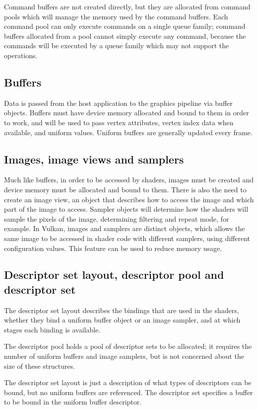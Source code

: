 Command buffers are not created directly, but they are allocated from command pools which will manage the memory used by the command buffers. Each command pool can only execute commands on a single queue family; command buffers allocated from a pool cannot simply execute any command, because the commands will be executed by a queue family which may not support the operations.

\subsection{Buffers}
Data is passed from the host application to the graphics pipeline via buffer objects. Buffers must have device memory allocated and bound to them in order to work, and will be used to pass vertex attributes, vertex index data when available, and uniform values. Uniform buffers are generally updated every frame.

\subsection{Images, image views and samplers}
Much like buffers, in order to be accessed by shaders, images must be created and device memory must be allocated and bound to them. There is also the need to create an image view, an object that describes how to access the image and which part of the image to access. Sampler objects will determine how the shaders will sample the pixels of the image, determining filtering and repeat mode, for example. In Vulkan, images and samplers are distinct objects, which allows the same image to be accessed in shader code with different samplers, using different configuration values. This feature can be used to reduce memory usage.

\subsection{Descriptor set layout, descriptor pool and descriptor set}
The descriptor set layout describes the bindings that are used in the shaders, whether they bind a uniform buffer object or an image sampler, and at which stages each binding is available.

The descriptor pool holds a pool of descriptor sets to be allocated; it requires the number of uniform buffers and image samplers, but is not concerned about the size of these structures.

The descriptor set layout is just a description of what types of descriptors can be bound, but no uniform buffers are referenced. The descriptor set specifies a buffer to be bound in the uniform buffer descriptor.

